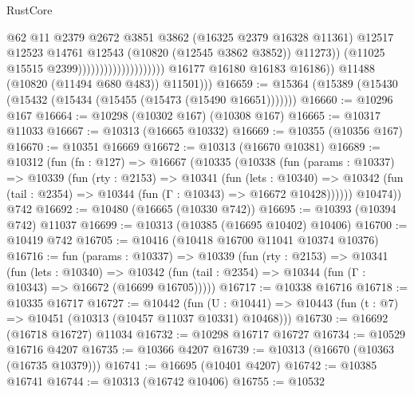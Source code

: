 \begin{lexlean}{RustCore}
\begin{coremodule}
                                                        @62
                                                        @11
                                                        @2379
                                                        @2672
                                                        @3851
                                                        @3862
                                                        (@16325 @2379 @16328 @11361)
                                                        @12517
                                                        @12523
                                                        @14761
                                                        @12543
                                                        (@10820 (@12545 @3862 @3852))
                                                        @11273))
                                                    (@11025 @15515 @2399))))))))))))))))))))
              @16177
              @16180
              @16183
              @16186))
          @11488
          (@10820 (@11494 @680 @483))
          @11501)))
@16659 := @15364 (@15389 (@15430 (@15432 (@15434 (@15455 (@15473 (@15490 @16651)))))))
@16660 := @10296 @167
@16664 := @10298 (@10302 @167) (@10308 @167)
@16665 := @10317 @11033
@16667 := @10313 (@16665 @10332)
@16669 := @10355 (@10356 @167)
@16670 := @10351 @16669
@16672 := @10313 (@16670 @10381)
@16689 := @10312
    (fun (fn : @127) =>
    @16667
      (@10335
        (@10338
          (fun (params : @10337) =>
          @10339
            (fun (rty : @2153) =>
            @10341
              (fun (lets : @10340) =>
              @10342 (fun (tail : @2354) => @10344 (fun (Γ : @10343) => @16672 @10428))))))
        @10474))
    @742
@16692 := @10480 (@16665 (@10330 @742))
@16695 := @10393 (@10394 @742) @11037
@16699 := @10313 (@10385 (@16695 @10402) @10406)
@16700 := @10419 @742
@16705 := @10416 (@10418 @16700 @11041 @10374 @10376)
@16716 := fun (params : @10337) =>
  @10339
    (fun (rty : @2153) =>
    @10341
      (fun (lets : @10340) =>
      @10342 (fun (tail : @2354) => @10344 (fun (Γ : @10343) => @16672 (@16699 @16705)))))
@16717 := @10338 @16716
@16718 := @10335 @16717
@16727 := @10442
    (fun (U : @10441) => @10443 (fun (t : @7) => @10451 (@10313 (@10457 @11037 @10331) @10468)))
@16730 := @16692 (@16718 @16727) @11034
@16732 := @10298 @16717 @16727
@16734 := @10529 @16716 @4207
@16735 := @10366 @4207
@16739 := @10313 (@16670 (@10363 (@16735 @10379)))
@16741 := @16695 (@10401 @4207)
@16742 := @10385 @16741
@16744 := @10313 (@16742 @10406)
@16755 := @10532

\end{coremodule}
\end{lexlean}
